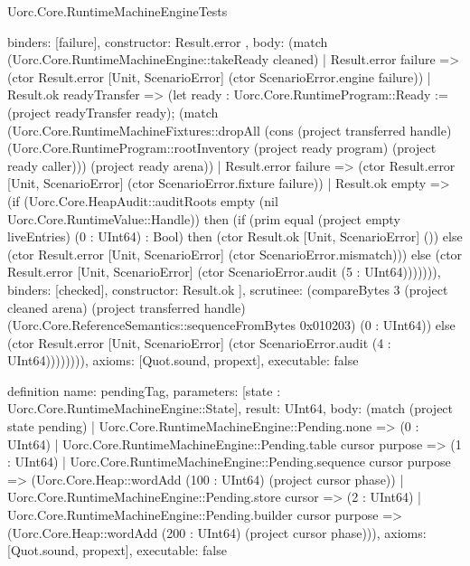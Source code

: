 \begin{lexlean}{Uorc.Core.RuntimeMachineEngineTests}
\begin{semanticmodule}
{{{                binders: [failure],
                constructor: Result.error
              },
              {
                body: (match (Uorc.Core.RuntimeMachineEngine::takeReady cleaned)
                  | Result.error failure => (ctor Result.error [Unit, ScenarioError] (ctor ScenarioError.engine failure))
                  | Result.ok readyTransfer => (let ready : Uorc.Core.RuntimeProgram::Ready := (project readyTransfer ready); (match (Uorc.Core.RuntimeMachineFixtures::dropAll (cons (project transferred handle) (Uorc.Core.RuntimeProgram::rootInventory (project ready program) (project ready caller))) (project ready arena))
                    | Result.error failure => (ctor Result.error [Unit, ScenarioError] (ctor ScenarioError.fixture failure))
                    | Result.ok empty => (if (Uorc.Core.HeapAudit::auditRoots empty (nil Uorc.Core.RuntimeValue::Handle)) then (if (prim equal (project empty liveEntries) (0 : UInt64) : Bool) then (ctor Result.ok [Unit, ScenarioError] ()) else (ctor Result.error [Unit, ScenarioError] (ctor ScenarioError.mismatch))) else (ctor Result.error [Unit, ScenarioError] (ctor ScenarioError.audit (5 : UInt64))))))),
                binders: [checked],
                constructor: Result.ok
              }
            ],
            scrutinee: (compareBytes 3 (project cleaned arena) (project transferred handle) (Uorc.Core.ReferenceSemantics::sequenceFromBytes 0x010203) (0 : UInt64))
          } else (ctor Result.error [Unit, ScenarioError] (ctor ScenarioError.audit (4 : UInt64)))))))),
  axioms: [Quot.sound, propext],
  executable: false
}

definition{
  name: pendingTag,
  parameters: [state : Uorc.Core.RuntimeMachineEngine::State],
  result: UInt64,
  body: (match (project state pending)
    | Uorc.Core.RuntimeMachineEngine::Pending.none => (0 : UInt64)
    | Uorc.Core.RuntimeMachineEngine::Pending.table cursor purpose => (1 : UInt64)
    | Uorc.Core.RuntimeMachineEngine::Pending.sequence cursor purpose => (Uorc.Core.Heap::wordAdd (100 : UInt64) (project cursor phase))
    | Uorc.Core.RuntimeMachineEngine::Pending.store cursor => (2 : UInt64)
    | Uorc.Core.RuntimeMachineEngine::Pending.builder cursor purpose => (Uorc.Core.Heap::wordAdd (200 : UInt64) (project cursor phase))),
  axioms: [Quot.sound, propext],
  executable: false
}


\end{semanticmodule}
\end{lexlean}
